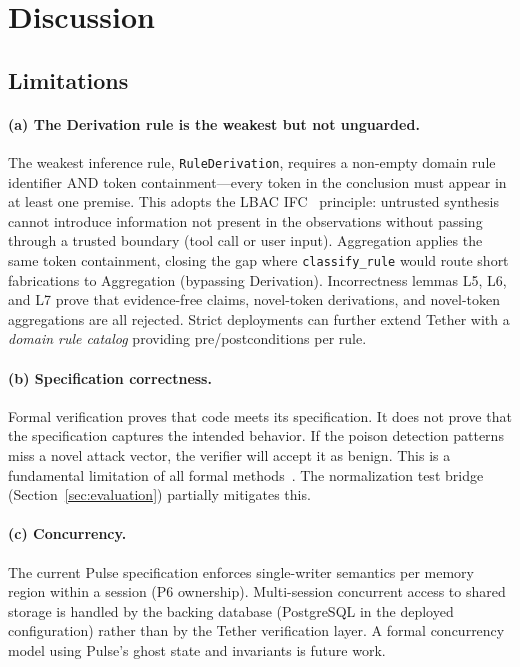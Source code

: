 \documentclass[sigplan,screen,nonacm]{acmart}
\begin{document}
\section{Discussion}
\label{sec:discussion}

\subsection{Limitations}

\paragraph{(a) The Derivation rule is the weakest but not unguarded.}
The weakest inference rule, \texttt{RuleDerivation}, requires a non-empty
domain rule identifier AND token containment---every token in the conclusion
must appear in at least one premise. This adopts the LBAC
IFC~\cite{zhou2026lbac} principle: untrusted synthesis cannot introduce
information not present in the observations without passing through a
trusted boundary (tool call or user input). Aggregation applies the same
token containment, closing the gap where \texttt{classify\_rule} would
route short fabrications to Aggregation (bypassing Derivation). Incorrectness
lemmas L5, L6, and L7 prove that evidence-free claims, novel-token
derivations, and novel-token aggregations are all rejected. Strict
deployments can further extend Tether with a \emph{domain rule catalog}
providing pre/postconditions per rule.

\paragraph{(b) Specification correctness.}
Formal verification proves that code meets its specification. It does not
prove that the specification captures the intended behavior. If the poison
detection patterns miss a novel attack vector, the verifier will accept it
as benign. This is a fundamental limitation of all formal
methods~\cite{rand2026verified}. The normalization test bridge (Section~\ref{sec:evaluation})
partially mitigates this.

\paragraph{(c) Concurrency.}
The current Pulse specification enforces single-writer semantics per memory
region within a session (P6 ownership). Multi-session concurrent access to
shared storage is handled by the backing database (PostgreSQL in the
deployed configuration) rather than by the Tether verification layer. A
formal concurrency model using Pulse's ghost state and invariants is future
work.
\end{document}
